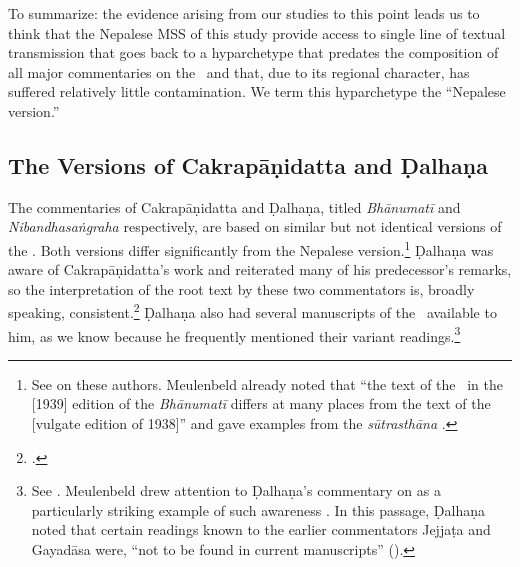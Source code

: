 %
%

To summarize: the evidence arising from our studies to this point leads us to
think that the Nepalese MSS of this study provide access to single line of textual
transmission that goes back to a hyparchetype that predates the composition of all
major commentaries on the \SS\ and that, due to its regional character, has
suffered relatively little contamination. We term this hyparchetype the “Nepalese
version.” 



\subsection{The Versions of Cakrapāṇidatta and Ḍalhaṇa}

The commentaries of Cakrapāṇidatta and Ḍalhaṇa, titled \emph{Bhānumatī} and
\emph{Nibandhasaṅgraha} respectively, are based on similar but not identical
versions of the \SS.  Both versions differ significantly from the Nepalese
version.\footnote{See \cite[IA 374--379]{meul-hist} on these authors. Meulenbeld
already noted that “the text of the \SS\ in the [1939] edition of the
\emph{Bhānumatī} differs at many places from the text of the [vulgate edition of
1938]” and gave examples from the \emph{sūtrasthāna} \citep[IB, 496, note
76]{meul-hist}.} Ḍalhaṇa was aware of Cakrapāṇidatta's work and reiterated many of
his predecessor's remarks, so the interpretation of the root text by these two
commentators is, broadly speaking, consistent.\footcite[IB, 499,
n.\,162]{meul-hist}  Ḍalhaṇa also had several manuscripts of the \SS\
available to him, as we know because he frequently mentioned their variant
readings.\footnote{See \cite[IA, 377]{meul-hist}.  Meulenbeld drew attention to
Ḍalhaṇa's commentary on \Su{5.8.24cd--25ab}{587} as a particularly striking
example of such awareness \citep[IB, 497, n.\,112]{meul-hist}.  In this passage, Ḍalhaṇa
noted that certain readings known to the earlier commentators Jejjaṭa and Gayadāsa
were, “not to be found in current manuscripts” 
().}

